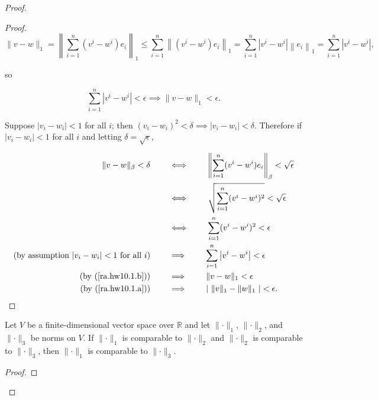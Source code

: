 \begin{proof}
\begin{proof}
\[
\lVert v - w \rVert_1 = \left \lVert  \sum_{i=1}^n (v^i - w^i) e_i \right\rVert_1 \leq  \sum_{i=1}^n \left \lVert   (v^i - w^i) e_i \right\rVert_1 =   \sum_{i=1}^n \left| v^i - w^i \right|  \left \lVert   e_i \right\rVert_1  =   \sum_{i=1}^n | v^i - w^i | ,
\]

so 

\begin{equation}\label{ra.hw10.1.b}
\sum_{i=1}^n |  v^i - w^i |  < \epsilon \implies \lVert v - w \rVert_1 < \epsilon.
\end{equation}

 Suppose \(| v_i - w_i| < 1\) for all \(i\); then \( (v_i - w_i)^2 < \delta \implies |v_i - w_i| < \delta\). Therefore if \(| v_i - w_i| < 1\) for all \(i\) and letting \(\delta = \sqrt{\epsilon}\),

\begin{align*}
\lVert v - w \rVert_\beta < \delta \qquad & \iff  \qquad  \left \lVert  \sum_{i=1}^n (v^i - w^i) e_i \right\rVert_\beta < \sqrt{\epsilon}
\\ & \iff  \qquad  \sqrt{ \sum_{i=1}^n (v^i - w^i)^2} < \sqrt{\epsilon}
\\ & \iff  \qquad   \sum_{i=1}^n (v^i - w^i)^2 < \epsilon
\\ \text{(by assumption \(| v_i - w_i| < 1\) for all \(i\))} \qquad & \implies \qquad \sum_{i=1}^n \left| v^i - w^i \right|  < \epsilon
\\ \text{(by (\ref{ra.hw10.1.b}))} \qquad  & \implies  \qquad  \lVert v - w \rVert_1 < \epsilon
\\ \text{(by (\ref{ra.hw10.1.a}))} \qquad & \implies  \qquad  |\  \lVert v \rVert_1 -  \lVert w \rVert_1 \ |  < \epsilon.
\end{align*} 

\end{proof}

\begin{lemma}\label{ra.hw10.lem.2} Let \(V\) be a finite-dimensional vector space over \(\mathbb{R}\) and let \(\lVert \cdot \rVert_1\), \(\lVert \cdot \rVert_2\), and \(\lVert \cdot \rVert_3\) be norms on \(V\). If \(\lVert \cdot \rVert_1\) is comparable to \(\lVert \cdot \rVert_2\) and \(\lVert \cdot \rVert_2\) is comparable to \(\lVert \cdot \rVert_3\), then \(\lVert \cdot \rVert_1\) is comparable to \(\lVert \cdot \rVert_3\).

\end{lemma}

\begin{proof}


\end{proof}
\end{proof}
